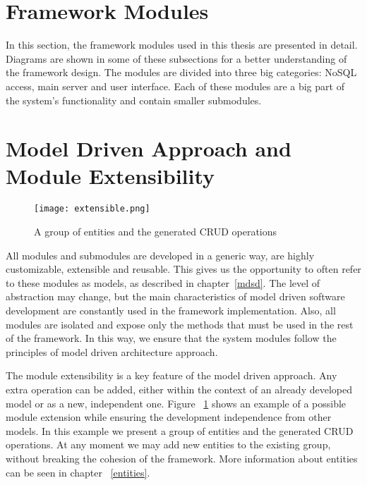 \section{Framework Modules}
\label{modules}
In this section, the framework modules used in this thesis are presented in detail. Diagrams are shown in some of these subsections for a better understanding of the framework design. The modules are divided into three big categories: NoSQL access, main server and user interface. Each of these modules are a big part of the system's functionality and contain smaller submodules.
	
\section{Model Driven Approach and Module Extensibility}
\begin{figure}
	\centerline{\texttt{[image: extensible.png]}}
	\caption{A group of entities and the generated CRUD operations}
	\label{extensible}
\end{figure}
All modules and submodules are developed in a generic way, are highly customizable, extensible and reusable. This gives us the opportunity to often refer to these modules as models, as described in chapter~\ref{mdsd}. The level of abstraction may change, but the main characteristics of model driven software development are constantly used in the framework implementation. Also, all modules are isolated and expose only the methods that must be used in the rest of the framework. In this way, we ensure that the system modules follow the principles of model driven architecture approach. \par
	The module extensibility is a key feature of the model driven approach. Any extra operation can be added, either within the context of an already developed model or as a new, independent one. Figure ~\ref{extensible} shows an example of a possible module extension while ensuring the development independence from other models. In this example we present a group of entities and the generated CRUD operations. At any moment we may add new entities to the existing group, without breaking the cohesion of the framework. More information about entities can be seen in chapter ~\ref{entities}.


